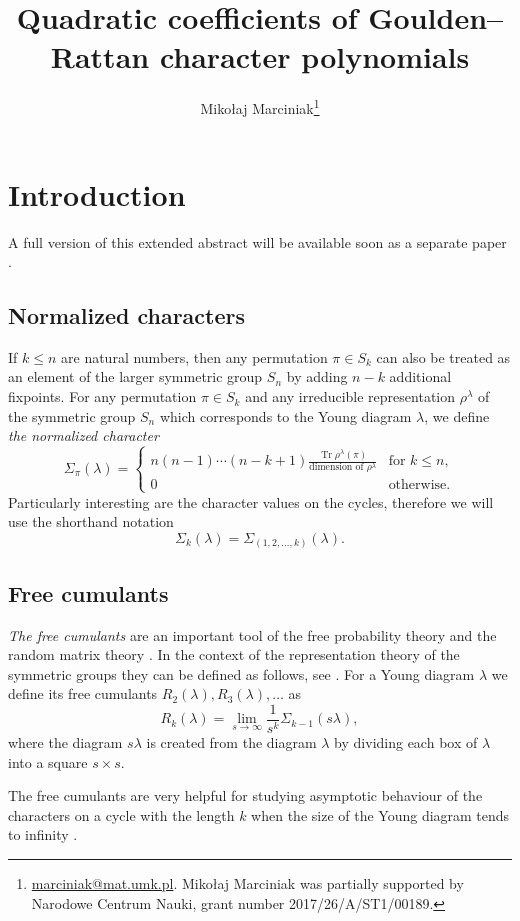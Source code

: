 \documentclass[submission]{FPSAC2021}
\title{Quadratic coefficients of Goulden--Rattan character polynomials}
\author[Mikołaj Marciniak]{Mikołaj Marciniak\thanks{\href{mailto:marciniak@mat.umk.pl}{marciniak@mat.umk.pl}. Mikołaj Marciniak was partially supported by Narodowe Centrum Nauki, grant number 2017/26/A/ST1/00189.}\addressmark{1}}
\begin{document}
\maketitle
\section{Introduction}

A full version of this extended abstract will be available soon 
as a separate paper \cite{Mar21}.

\subsection{Normalized characters}

If $k\leq n$ are natural numbers, then any permutation $\pi \in S_k$ can also be
treated as an element of the larger symmetric group $S_n$ by adding $n-k$ additional
fixpoints. For any permutation $\pi \in S_k$ and any irreducible representation
$\rho^{\lambda}$ of the symmetric group $S_n$ which corresponds to the
Young diagram $\lambda$, we define \emph{the normalized character}
$$
\Sigma_{\pi}(\lambda)
= \begin{cases} 
          n(n-1)\cdots(n-k+1)\frac{\operatorname{Tr}\rho^{\lambda}(\pi)}{\text{dimension of }\rho^{\lambda}} & \text{for } k \leq n,\\
          0 & \text{otherwise.}
\end{cases}
$$
Particularly interesting are the character values on the cycles, therefore we
will use the shorthand notation
$$\Sigma_{k}(\lambda)=\Sigma_{(1,2,\ldots,k)}(\lambda).$$

\subsection{Free cumulants}

\emph{The free cumulants} are an important tool of the free probability theory
\cite{VDN92} and the random matrix theory \cite{Voi91}. 
In the context of the representation theory of the symmetric groups they can be defined as follows, see \cite{Bia03}. For a Young diagram $\lambda$ we define its free cumulants $R_2(\lambda), R_3(\lambda), \ldots$ as
$$R_k(\lambda)=\lim_{s\to\infty} \frac{1}{s^k}\Sigma_{k-1}(s\lambda),$$
where the diagram $s\lambda$ is created from the diagram $\lambda$ by 
dividing each box of $\lambda$ into a square $s\times s$. 

The free cumulants are very helpful for studying asymptotic behaviour of the characters on a cycle with the length $k$ when the size of the Young diagram tends to infinity \cite{Bia98}.
\end{document}

